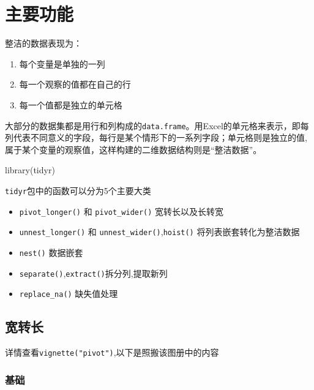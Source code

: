 \documentclass[
]{book}
\newenvironment{Shaded}{\begin{snugshade}}{\end{snugshade}}
\newcommand{\FunctionTok}[1]{\textcolor[rgb]{0.00,0.00,0.00}{#1}}
\newcommand{\NormalTok}[1]{#1}
\providecommand{\tightlist}{%
  \setlength{\itemsep}{0pt}\setlength{\parskip}{0pt}}
\begin{document}
\hypertarget{ux4e3bux8981ux529fux80fd}{%
\section{主要功能}\label{ux4e3bux8981ux529fux80fd}}

整洁的数据表现为：

\begin{enumerate}
\def\labelenumi{\arabic{enumi}.}
\tightlist
\item
  每个变量是单独的一列
\item
  每一个观察的值都在自己的行
\item
  每一个值都是独立的单元格
\end{enumerate}

大部分的数据集都是用行和列构成的\texttt{data.frame}。用Excel的单元格来表示，即每列代表不同意义的字段，每行是某个情形下的一系列字段；单元格则是独立的值,属于某个变量的观察值，这样构建的二维数据结构则是``整洁数据''。

\begin{Shaded}
\begin{Highlighting}[]
\FunctionTok{library}\NormalTok{(tidyr)}
\end{Highlighting}
\end{Shaded}

\texttt{tidyr}包中的函数可以分为5个主要大类

\begin{itemize}
\item
  \texttt{pivot\_longer()} 和 \texttt{pivot\_wider()} 宽转长以及长转宽
\item
  \texttt{unnest\_longer()} 和 \texttt{unnest\_wider()},\texttt{hoist()} 将列表嵌套转化为整洁数据
\item
  \texttt{nest()} 数据嵌套
\item
  \texttt{separate()},\texttt{extract()}拆分列,提取新列
\item
  \texttt{replace\_na()} 缺失值处理
\end{itemize}

\hypertarget{ux5bbdux8f6cux957f}{%
\subsection{宽转长}\label{ux5bbdux8f6cux957f}}

详情查看\texttt{vignette("pivot")},以下是照搬该图册中的内容

\hypertarget{ux57faux7840-1}{%
\subsubsection{基础}\label{ux57faux7840-1}}
\end{document}
